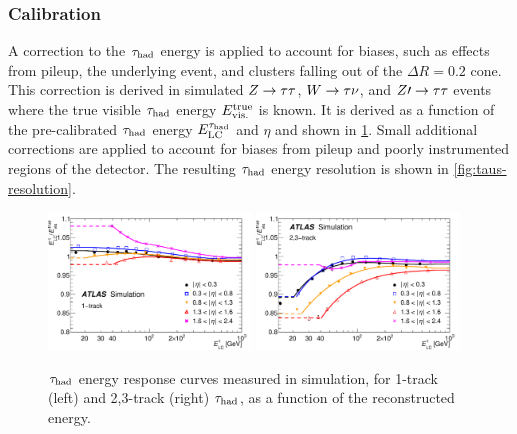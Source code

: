 \subsubsection{Calibration}

A correction to the $\tau_\text{had}$ energy is applied to account for biases, such as effects from pileup, the underlying event, and clusters falling out of the $\Delta R = 0.2$ cone. This correction is derived in simulated $Z\rightarrow\tau\tau$, $W\rightarrow\tau\nu$, and $Z\prime\rightarrow\tau\tau$ events where the true visible $\tau_\text{had}$ energy $E_\text{vis.}^\text{true}$ is known. It is derived as a function of the pre-calibrated $\tau_\text{had}$ energy $E_\text{LC}^{\tau_\text{had}}$ and $\eta$ and shown in \cref{fig:taus-calibration}. Small additional corrections are applied to account for biases from pileup and poorly instrumented regions of the detector. The resulting $\tau_\text{had}$ energy resolution is shown in \cref{fig:taus-resolution}.

\begin{figure}[tp]
  \centering
  \includegraphics[width=0.48\textwidth]{figures/PERF-2013-06/fig_15a}
  \includegraphics[width=0.48\textwidth]{figures/PERF-2013-06/fig_15b}
  \caption{$\tau_\text{had}$ energy response curves measured in simulation, for 1-track (left) and 2,3-track (right) $\tau_\text{had}$, as a function of the reconstructed energy.}
  \label{fig:taus-calibration}
\end{figure}

